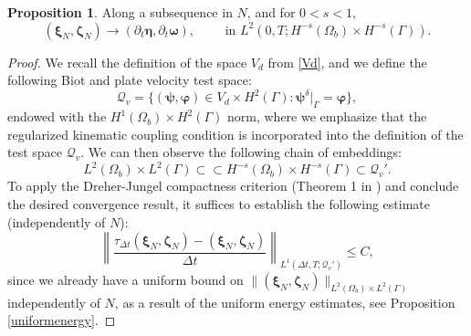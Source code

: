 \documentclass[11pt]{article}
\newcommand{\bd}{\boldsymbol}
\theoremstyle{definition}
\newtheorem{proposition}{Proposition}[section]
\begin{document}
\begin{proposition}
Along a subsequence in $N$, and for $0 < s < 1$, 
\begin{equation*}
(\bd{\xi}_{N}, \bd{\zeta}_{N}) \to (\partial_{t}\bd{\eta}, \partial_{t}\bd{\omega}), \qquad \text{ in } L^{2}(0, T; H^{-s}(\Omega_{b}) \times H^{-s}(\Gamma)).
\end{equation*}
\end{proposition}

\begin{proof}
We recall the definition of the space $V_{d}$ from \eqref{Vd}, and we define the following Biot and plate velocity test space:
\begin{equation}\label{Qv}
\mathcal{Q}_{v} = \{(\bd{\psi}, \bd{\varphi}) \in V_{d} \times H^{2}(\Gamma): \bd{\psi}^{\delta}|_{\Gamma} = \bd{\varphi}\},
\end{equation}
endowed with the $H^{1}(\Omega_{b}) \times H^{2}(\Gamma)$ norm, where we emphasize that the regularized kinematic coupling condition is incorporated into the definition of the test space $\mathcal{Q}_{v}$. We can then observe the following chain of embeddings:
\begin{equation*}
L^{2}(\Omega_{b}) \times L^{2}(\Gamma) \subset \subset H^{-s}(\Omega_{b}) \times H^{-s}(\Gamma) \subset \mathcal{Q}_{v}'.
\end{equation*}
To apply the Dreher-Jungel compactness criterion (Theorem 1 in \cite{DreherJungel}) and conclude the desired convergence result, it suffices to establish the following estimate (independently of $N$):
\begin{equation*}
\left\|\frac{\tau_{\Delta t}(\bd{\xi}_{N}, \bd{\zeta}_{N}) - (\bd{\xi}_{N}, \bd{\zeta}_{N})}{\Delta t}\right\|_{L^{1}(\Delta t, T; \mathcal{Q}_{v}')} \le C,
\end{equation*}
since we already have a uniform bound on $\|(\bd{\xi}_{N}, \bd{\zeta}_{N})\|_{L^{2}(\Omega_{b}) \times L^{2}(\Gamma)}$ independently of $N$, as a result of the uniform energy estimates, see Proposition \ref{uniformenergy}.


\end{proof}
\end{document}
